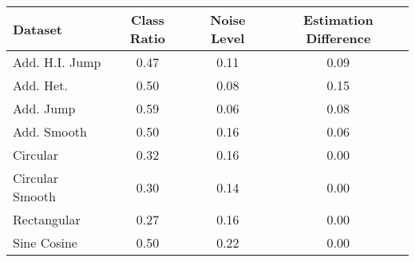 \begin{tabular} {lccc}
\toprule
Dataset & Class Ratio & Noise Level & Estimation Difference \\
\midrule
Add. H.I. Jump & 0.47 & 0.11 & 0.09 \\
Add. Het. & 0.50 & 0.08 & 0.15 \\
Add. Jump & 0.59 & 0.06 & 0.08 \\
Add. Smooth & 0.50 & 0.16 & 0.06 \\
Circular & 0.32 & 0.16 & 0.00 \\
Circular Smooth & 0.30 & 0.14 & 0.00 \\
Rectangular & 0.27 & 0.16 & 0.00 \\
Sine Cosine & 0.50 & 0.22 & 0.00 \\
\bottomrule
\end{tabular}
